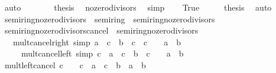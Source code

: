 \begin{isabellebody}
\ auto\isanewline
\ \ \ \ \isamarkupfalse%
\ \isamarkupfalse%
\ {\isacharquery}{\kern0pt}thesis\ \isamarkupfalse%
\ no{\isacharunderscore}{\kern0pt}zero{\isacharunderscore}{\kern0pt}divisors\ \isamarkupfalse%
\ simp\isanewline
{}\isamarkupfalse%
\isanewline
\ \ \isamarkupfalse%
\ True\isanewline
\ \ \isamarkupfalse%
\ \isamarkupfalse%
\ {\isacharquery}{\kern0pt}thesis\ \isamarkupfalse%
\ auto\isanewline
{}\isamarkupfalse%
%
\endisatagproof
{\isafoldproof}%
%
\isadelimproof
\isanewline
%
\endisadelimproof
\isanewline
{}\isamarkupfalse%
\isanewline
\isanewline
{}\isamarkupfalse%
\ semiring{\isacharunderscore}{\kern0pt}{}{\isacharunderscore}{\kern0pt}no{\isacharunderscore}{\kern0pt}zero{\isacharunderscore}{\kern0pt}divisors\ {\isacharequal}{\kern0pt}\ semiring{\isacharunderscore}{\kern0pt}{}\ {\isacharplus}{\kern0pt}\ semiring{\isacharunderscore}{\kern0pt}no{\isacharunderscore}{\kern0pt}zero{\isacharunderscore}{\kern0pt}divisors\isanewline
\isanewline
{}\isamarkupfalse%
\ semiring{\isacharunderscore}{\kern0pt}no{\isacharunderscore}{\kern0pt}zero{\isacharunderscore}{\kern0pt}divisors{\isacharunderscore}{\kern0pt}cancel\ {\isacharequal}{\kern0pt}\ semiring{\isacharunderscore}{\kern0pt}no{\isacharunderscore}{\kern0pt}zero{\isacharunderscore}{\kern0pt}divisors\ {\isacharplus}{\kern0pt}\isanewline
\ \ \ mult{\isacharunderscore}{\kern0pt}cancel{\isacharunderscore}{\kern0pt}right\ {\isacharbrackleft}{\kern0pt}simp{\isacharbrackright}{\kern0pt}{\isacharcolon}{\kern0pt}\ {\isachardoublequoteopen}a\ {\isacharasterisk}{\kern0pt}\ c\ {\isacharequal}{\kern0pt}\ b\ {\isacharasterisk}{\kern0pt}\ c\ {\isasymlongleftrightarrow}\ c\ {\isacharequal}{\kern0pt}\ {}\ {\isasymor}\ a\ {\isacharequal}{\kern0pt}\ b{\isachardoublequoteclose}\isanewline
\ \ \ \ \ mult{\isacharunderscore}{\kern0pt}cancel{\isacharunderscore}{\kern0pt}left\ {\isacharbrackleft}{\kern0pt}simp{\isacharbrackright}{\kern0pt}{\isacharcolon}{\kern0pt}\ {\isachardoublequoteopen}c\ {\isacharasterisk}{\kern0pt}\ a\ {\isacharequal}{\kern0pt}\ c\ {\isacharasterisk}{\kern0pt}\ b\ {\isasymlongleftrightarrow}\ c\ {\isacharequal}{\kern0pt}\ {}\ {\isasymor}\ a\ {\isacharequal}{\kern0pt}\ b{\isachardoublequoteclose}\isanewline
{}\isanewline
\isanewline
{}\isamarkupfalse%
\ mult{\isacharunderscore}{\kern0pt}left{\isacharunderscore}{\kern0pt}cancel{\isacharcolon}{\kern0pt}\ {\isachardoublequoteopen}c\ {\isasymnoteq}\ {}\ {\isasymLongrightarrow}\ c\ {\isacharasterisk}{\kern0pt}\ a\ {\isacharequal}{\kern0pt}\ c\ {\isacharasterisk}{\kern0pt}\ b\ {\isasymlongleftrightarrow}\ a\ {\isacharequal}{\kern0pt}\ b{\isachardoublequoteclose}\isanewline

\end{isabellebody}
